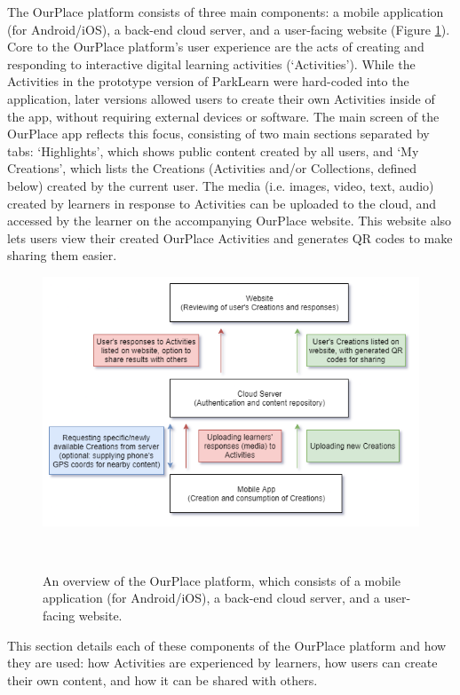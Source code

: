The OurPlace platform consists of three main components: a mobile application (for Android/iOS), a back-end cloud server, and a user-facing website (Figure \ref{fig:PlatformDiagram}). Core to the OurPlace platform's user experience are the acts of creating and responding to interactive digital learning activities (`Activities'). While the Activities in the prototype version of ParkLearn were hard-coded into the application, later versions allowed users to create their own Activities inside of the app, without requiring external devices or software. The main screen of the OurPlace app reflects this focus, consisting of two main sections separated by tabs: `Highlights', which shows public content created by all users, and `My Creations', which lists the Creations (Activities and/or Collections, defined below) created by the current user. The media (i.e. images, video, text, audio) created by learners in response to Activities can be uploaded to the cloud, and accessed by the learner on the accompanying OurPlace website. This website also lets users view their created OurPlace Activities and generates QR codes to make sharing them easier.

\begin{figure}
  \centering
  \includegraphics[width=0.9\columnwidth]{images/chapter05/OurPlace_platform.png}
  \caption[Overview of the OurPlace platform]{An overview of the OurPlace platform, which consists of a mobile application (for Android/iOS), a back-end cloud server, and a user-facing website.}~\label{fig:PlatformDiagram}
\end{figure}

This section details each of these components of the OurPlace platform and how they are used: how Activities are experienced by learners, how users can create their own content, and how it can be shared with others.

